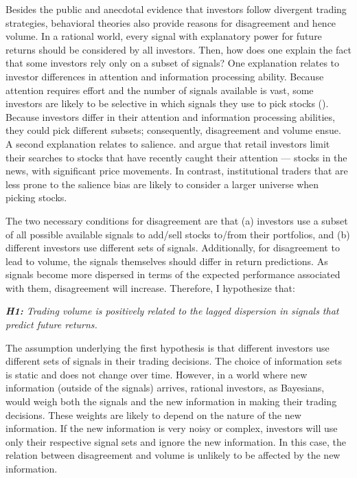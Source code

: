 \documentclass[
  12pt,
  a4paper,
  twoside,
  onecolumn]{article}
\begin{document}
Besides the public and anecdotal evidence that investors follow
divergent trading strategies, behavioral theories also provide reasons
for disagreement and hence volume. In a rational world, every signal
with explanatory power for future returns should be considered by all
investors. Then, how does one explain the fact that some investors rely
only on a subset of signals? One explanation relates to investor
differences in attention and information processing ability. Because
attention requires effort and the number of signals available is vast,
some investors are likely to be selective in which signals they use to
pick stocks (\cite{kahneman_book_1973}). Because investors differ in
their attention and information processing abilities, they could pick
different subsets; consequently, disagreement and volume ensue. A second
explanation relates to salience. \cite{odean_1999} and
\cite{barber_and_odean_2008} argue that retail investors limit their
searches to stocks that have recently caught their attention --- stocks
in the news, with significant price movements. In contrast,
institutional traders that are less prone to the salience bias are
likely to consider a larger universe when picking stocks.

The two necessary conditions for disagreement are that (a) investors use
a subset of all possible available signals to add/sell stocks to/from
their portfolios, and (b) different investors use different sets of
signals. Additionally, for disagreement to lead to volume, the signals
themselves should differ in return predictions. As signals become more
dispersed in terms of the expected performance associated with them,
disagreement will increase. Therefore, I hypothesize that:

\textit{\textbf{H1:} Trading volume is positively related to the lagged dispersion in signals that predict future returns.}

The assumption underlying the first hypothesis is that different
investors use different sets of signals in their trading decisions. The
choice of information sets is static and does not change over time.
However, in a world where new information (outside of the signals)
arrives, rational investors, as Bayesians, would weigh both the signals
and the new information in making their trading decisions. These weights
are likely to depend on the nature of the new information. If the new
information is very noisy or complex, investors will use only their
respective signal sets and ignore the new information. In this case, the
relation between disagreement and volume is unlikely to be affected by
the new information.
\end{document}
